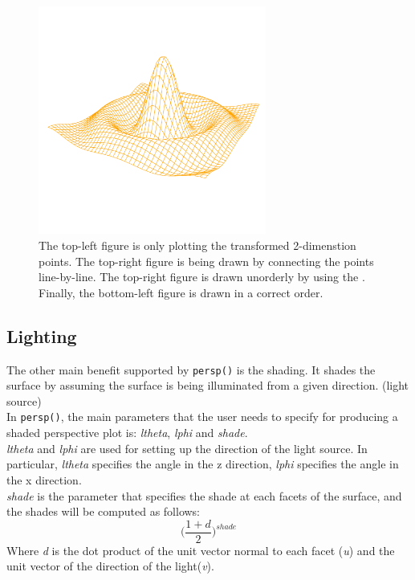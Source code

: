 \documentclass[paper=a4, fontsize=11pt]{report}
\begin{document}
\begin{figure}[h]
\begin{center}
  \includegraphics[height = 7.5cm, width = 7.5cm]{figure/standalone_p_4.pdf}
  \caption{The top-left figure is only plotting the transformed 2-dimenstion points. The top-right figure is being drawn by connecting the points line-by-line. The top-right figure is drawn unorderly by using the . Finally, the bottom-left figure is drawn in a correct order.}
  	\label{figure_3.2}
\end{center}
\end{figure}

\subsection{Lighting}
The other main benefit supported by \texttt{persp()} is the shading. It shades the surface by assuming the surface is being illuminated from a given direction. (light source) \\

In \texttt{persp()}, the main parameters that the user needs to specify for producing a shaded perspective plot is: \textit{ltheta}, \textit{lphi} and \textit{shade}.\\

\textit{ltheta} and \textit{lphi} are used for setting up the direction of the light source. In particular, \textit{ltheta} specifies the angle in the z direction, \textit{lphi} specifies the angle in the x direction. \\

\textit{shade} is the parameter that specifies the shade at each facets of the surface, and the shades will be computed as follows:
\begin{equation}
\big(\frac{1 + d}{2}\big)^{shade}
\end{equation}
Where \textit{d} is the dot product of the unit vector normal to each facet (\textit{u}) and the unit vector of the direction of the light(\textit{v}). \\
\end{document}

